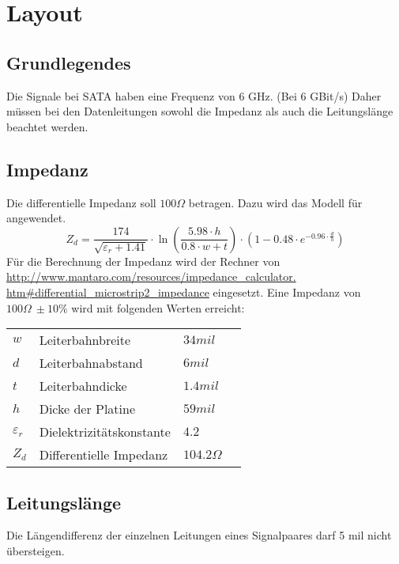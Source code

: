 
\section{Layout}

\subsection{Grundlegendes}
Die Signale bei SATA haben eine Frequenz von 6 GHz. (Bei 6 GBit/s)
Daher müssen bei den Datenleitungen sowohl die Impedanz als auch die 
Leitungslänge beachtet werden. 

\subsection{Impedanz}
Die differentielle Impedanz soll $100 \Omega$ betragen. Dazu wird das Modell 
für  angewendet. 
\[ Z_d = \frac{174}{\sqrt{\varepsilon_r + 1.41}} \cdot 
\ln \left(\frac{5.98 \cdot h}{0.8 \cdot w + t}\right) \cdot 
\left(1 - 0.48 \cdot e^{-0.96 \cdot \frac{d}{h}}\right) \]
Für die Berechnung der Impedanz wird der Rechner von 
\url{http://www.mantaro.com/resources/impedance_calculator.
htm#differential_microstrip2_impedance} 
eingesetzt. 
Eine Impedanz von $100 \Omega~\pm 10 \%$ wird mit folgenden Werten erreicht: 
\begin{tabular}{@{}llll}
$w$             & Leiterbahnbreite          &   $34 mil$        \\
$d$             & Leiterbahnabstand         &   $6 mil$         \\
$t$             & Leiterbahndicke           &   $1.4 mil$       \\
$h$             & Dicke der Platine         &   $59 mil$        \\
$\varepsilon_r$ & Dielektrizitätskonstante  &   $4.2$           \\
$Z_d$           & Differentielle Impedanz   &   $104.2 \Omega$  
\end{tabular}

\subsection{Leitungslänge}
Die Längendifferenz der einzelnen Leitungen eines Signalpaares darf 5 mil 
nicht übersteigen. 
